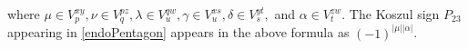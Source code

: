 \ee
{}
where $\mu\in V^{xy}_p,\nu\in V^{pz}_q,\lambda\in V^{qw}_u,\gamma\in V^{xs}_u,\delta\in V^{yt}_s,$ and $\alpha\in V^{zw}_t$. 
The Koszul sign $P_{23}$ appearing in \eqref{endoPentagon} appears in the above formula as $(-1)^{|\mu||\alpha|}$. 



